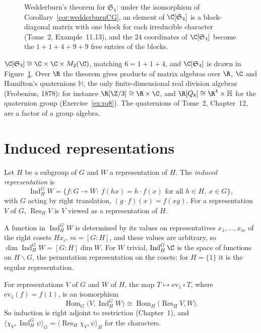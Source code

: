 \begin{figure}[ht]
\centering
{}
\caption{Wedderburn's theorem for $\mathfrak S_4$: under the isomorphism of Corollary~\ref{cor:wedderburnCG}, an element of $\C[\mathfrak S_4]$ is a block-diagonal matrix with one block for each irreducible character (Tome~2, Example~11.13), and the
$24$ coordinates of $\C[\mathfrak S_4]$ become the $1+1+4+9+9$ free entries of the blocks.}
\label{fig:wedderburn}
\end{figure}

\begin{example}\label{ex:wedderburnsmall}
$\C[\mathfrak S_3]\cong\C\times\C\times M_2(\C)$, matching $6=1+1+4$, and $\C[\mathfrak S_4]$ is drawn in Figure~\ref{fig:wedderburn}. Over $\R$ the theorem gives products of matrix algebras over $\R$, $\C$ and Hamilton's quaternions $\mathbb H$, the only finite-dimensional real
division algebras (Frobenius, 1878): for instance $\R[\Z/3]\cong\R\times\C$, and $\R[Q_8]\cong\R^4\times\mathbb H$ for the quaternion group (Exercise~\ref{ex:rq8}). The quaternions of Tome~2, Chapter~12, are a factor of a group
algebra.
\end{example}

\section{Induced representations}

\begin{definition}\label{def:induced}
Let $H$ be a subgroup of $G$ and $W$ a representation of $H$. The \emph{induced representation} is
\[
\operatorname{Ind}_H^GW=\{f\colon G\to W:\ f(hx)=h\cdot f(x)\text{ for all }h\in H,\ x\in G\},
\]
with $G$ acting by right translation, $(g\cdot f)(x)=f(xg)$. For a representation $V$ of $G$, $\operatorname{Res}_HV$ is $V$ viewed as a representation of $H$.
\end{definition}

A function in $\operatorname{Ind}_H^GW$ is determined by its values on representatives $x_1,\dots,x_m$ of the right cosets $Hx_i$, $m=[G:H]$, and these values are arbitrary, so $\dim\operatorname{Ind}_H^GW=[G:H]\dim W$.
For $W$ trivial, $\operatorname{Ind}_H^G\C$ is the space of functions on $H\backslash G$, the permutation representation on the cosets; for $H=\{1\}$ it is the regular representation.

\begin{theorem}\label{thm:frobrecip}
For representations $V$ of $G$ and $W$ of $H$, the map $T\mapsto\mathrm{ev}_1\circ T$, where $\mathrm{ev}_1(f)=f(1)$, is an isomorphism
\[
\operatorname{Hom}_G\bigl(V,\operatorname{Ind}_H^GW\bigr)\cong\operatorname{Hom}_H\bigl(\operatorname{Res}_HV,W\bigr).
\]
So induction is right adjoint to restriction (Chapter~1), and $\langle\chi_V,\operatorname{Ind}_H^G\psi\rangle_G=\langle\operatorname{Res}_H\chi_V,\psi\rangle_H$ for the characters.
\end{theorem}

